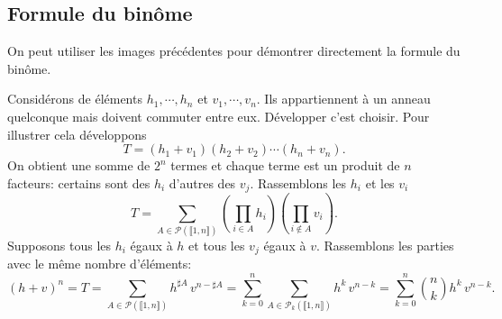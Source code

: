 \subsection{Formule du binôme}
On peut utiliser les images précédentes pour démontrer directement la formule du binôme. 
\begin{demo}
Considérons de éléments $h_1,\cdots, h_n$ et $v_1,\cdots,v_n$. Ils appartiennent à un anneau quelconque mais doivent commuter entre eux.\newline
Développer c'est choisir. Pour illustrer cela développons 
\[
 T = (h_1 + v_1)(h_2 + v_2) \cdots (h_n + v_n).
\]
On obtient une somme de $2^n$ termes et chaque terme est un produit de $n$ facteurs: certains sont des $h_i$ d'autres des $v_j$. Rassemblons les $h_i$ et les $v_i$
\[
 T = \sum_{A \in \mathcal{P}(\llbracket 1,n \rrbracket)} \left( \prod_{i\in A}h_i\right) \left( \prod_{i \notin A}v_i\right).
\]
Supposons tous les $h_i$ égaux à $h$ et tous les $v_j$ égaux à $v$. Rassemblons les parties avec le même nombre d'éléments:
\[
 (h + v)^n = T = \sum_{A \in \mathcal{P}(\llbracket 1,n \rrbracket)} h^{\sharp A}\, v^{n - \sharp A}
 = \sum_{k = 0}^{n}\sum_{A \in \mathcal{P}_k(\llbracket 1,n \rrbracket)} h^{k}\, v^{n - k}
 = \sum_{k = 0}^{n}\binom{n}{k} h^{k}\, v^{n - k}.
\] 
\end{demo}



